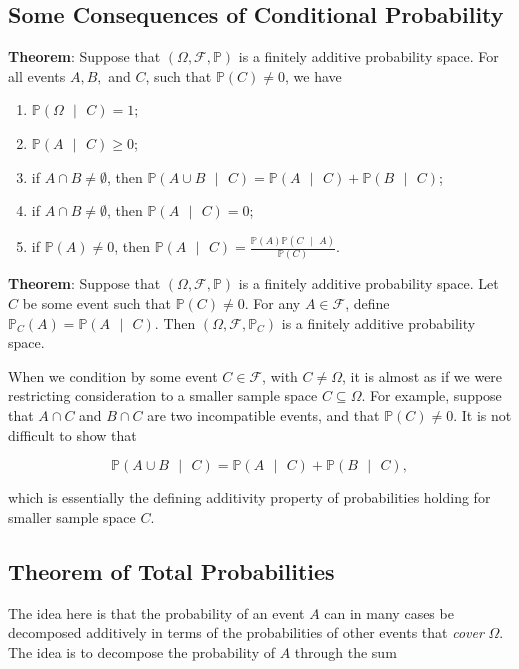\documentclass[12pt]{article}
\newcommand{\prob}[1]{\mathbb{P}(#1)}
\newcommand{\condprob}[2]{\mathbb{P}(#1 \text{ } \lvert \text{ } #2)}
\newcommand{\field}{\mathcal{F}}
\begin{document}
\subsection*{Some Consequences of Conditional Probability}
\noindent
\textbf{Theorem}: Suppose that $(\Omega, \field, \mathbb{P})$ is a finitely additive probability space. For all events $A,B,$ and $C$, such that $\prob{C} \neq 0$, we have

\begin{enumerate}[label=(\roman*)]
\item $\condprob{\Omega}{C} = 1$;
\item $\condprob{A}{C} \geq 0$;
\item if $A \cap B \neq \emptyset$, then $\condprob{A \cup B}{C} = \condprob{A}{C} + \condprob{B}{C}$;
\item if $A \cap B \neq \emptyset$, then $\condprob{A}{C} = 0$;
\item if $\prob{A} \neq 0$, then $\condprob{A}{C} = \frac{\prob{A} \condprob{C}{A}}{\prob{C}}$.
\end{enumerate}

\noindent
\textbf{Theorem}: Suppose that $(\Omega, \field, \mathbb{P})$ is a finitely additive probability space. Let $C$ be some event such that $\prob{C} \neq 0$. For any $A \in \field$, define $\mathbb{P}_C(A) = \condprob{A}{C}$. Then $(\Omega, \field, \mathbb{P}_C)$ is a finitely additive probability space.

\noindent
When we condition by some event $C \in \field$, with $C \neq \Omega$, it is almost as if we were restricting consideration to a smaller sample space $C \subseteq \Omega$. For example, suppose that $A \cap C$ and $B \cap C$ are two incompatible events, and that $\prob{C} \neq 0$. It is not difficult to show that

\begin{equation*}
\condprob{A \cup B	}{C} = \condprob{A}{C} + \condprob{B}{C},
\end{equation*}

\noindent
which is essentially the defining additivity property of probabilities holding for smaller sample space $C$.

\subsection*{Theorem of Total Probabilities}
\noindent
The idea here is that the probability of an event $A$ can in many cases be decomposed additively in terms of the probabilities of other events that \textit{cover} $\Omega$. The idea is to decompose the probability of $A$ through the sum
\end{document}

